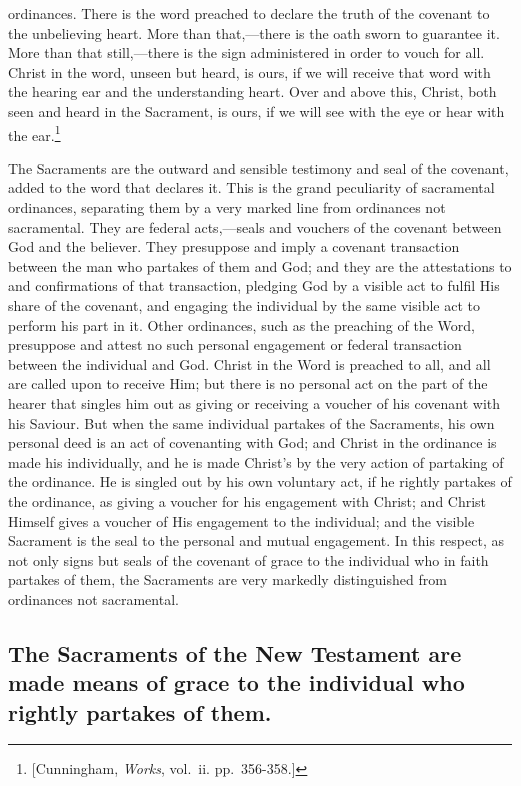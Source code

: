 \documentclass[]{book}
\begin{document}
ordinances. There is the word preached to declare the truth of the covenant to the unbelieving heart. More than that,---there is the oath sworn to guarantee it. More than that still,---there is the sign administered in order to vouch for all. Christ in the word, unseen but heard, is ours, if we will receive that word with the hearing ear and the understanding heart. Over and above this, Christ, both seen and heard in the Sacrament, is ours, if we will see with the eye or hear with the ear.\footnote{{[}Cunningham, \emph{Works}, vol.~ii. pp.~356-358.{]}}

The Sacraments are the outward and sensible testimony and seal of the covenant, added to the word that declares it. This is the grand peculiarity of sacramental ordinances, separating them by a very marked line from ordinances not sacramental. They are federal acts,---seals and vouchers of the covenant between God and the believer. They presuppose and imply a covenant transaction between the man who partakes of them and God; and they are the attestations to and confirmations of that transaction, pledging God by a visible act to fulfil His share of the covenant, and engaging the individual by the same visible act to perform his part in it. Other ordinances, such as the preaching of the Word, presuppose and attest no such personal engagement or federal transaction between the individual and God. Christ in the Word is preached to all, and all are called upon to receive Him; but there is no personal act on the part of the hearer that singles him out as giving or receiving a voucher of his covenant with his Saviour. But when the same individual partakes of the Sacraments, his own personal deed is an act of covenanting with God; and Christ in the ordinance is made his individually, and he is made Christ's by the very action of partaking of the ordinance. He is singled out by his own voluntary act, if he rightly partakes of the ordinance, as giving a voucher for his engagement with Christ; and Christ Himself gives a voucher of His engagement to the individual; and the visible Sacrament is the seal to the personal and mutual engagement. In this respect, as not only signs but seals of the covenant of grace to the individual who in faith partakes of them, the Sacraments are very markedly distinguished from ordinances not sacramental.

\hypertarget{the-sacraments-of-the-new-testament-are-made-means-of-grace-to-the-individual-who-rightly-partakes-of-them.}{%
\subsection{The Sacraments of the New Testament are made means of grace to the individual who rightly partakes of them.}\label{the-sacraments-of-the-new-testament-are-made-means-of-grace-to-the-individual-who-rightly-partakes-of-them.}}
\end{document}
